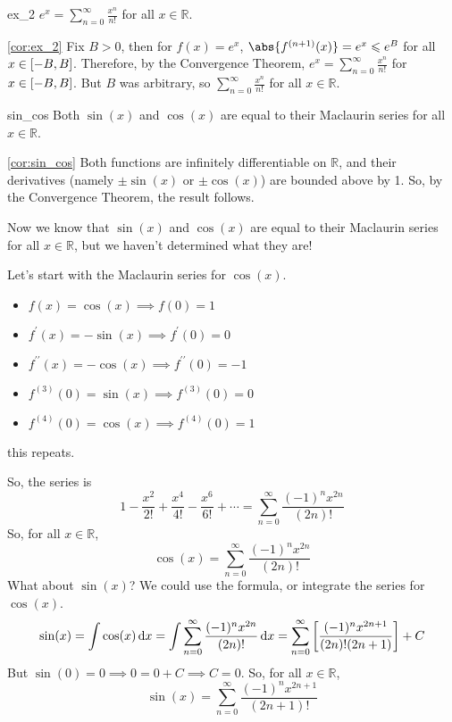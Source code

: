\begin{Corollary}{}{ex_2}
    $ \displaystyle  e^x=\sum\limits_{n=0}^{\infty}\frac{x^n}{n!} $
    for all $ x\in\mathbb{R} $.
\end{Corollary}
\begin{Proof}{\ref{cor:ex_2}}{}
    Fix $ B>0 $, then for $ f(x)=e^x $, $ \abs{f^{(n+1)}(x)}=e^x\leqslant e^B $
    for all $ x\in\interval{-B}{B} $. Therefore, by the Convergence
    Theorem, $ \displaystyle e^x=\sum\limits_{n=0}^{\infty} \frac{x^n}{n!}  $ for $ x\in\interval{-B}{B} $.
    But $ B $ was arbitrary, so $ \displaystyle\sum\limits_{n=0}^{\infty} \frac{x^n}{n!} $
    for all $ x\in\mathbb{R} $.
\end{Proof}

\begin{Corollary}{}{sin_cos}
    Both $ \sin(x) $ and $ \cos(x) $ are equal to their Maclaurin
    series for all $ x\in\mathbb{R} $.
\end{Corollary}

\begin{Proof}{\ref{cor:sin_cos}}{}
    Both functions are infinitely differentiable on
    $ \mathbb{R} $, and their derivatives (namely $ \pm \sin(x) $ or $ \pm\cos(x) $)
    are bounded above by 1. So, by the Convergence Theorem,
    the result follows.
\end{Proof}

Now we know that $ \sin(x) $ and $ \cos(x) $ are equal to their
Maclaurin series for all $ x\in\mathbb{R} $, but we haven't
determined what they are!

Let's start with the Maclaurin series for $ \cos(x) $.
\begin{itemize}
    \item $ f(x)=\cos(x)\implies f(0)=1 $
    \item $ f^\prime(x)=-\sin(x)\implies f^\prime(0)=0 $
    \item $ f^{\prime\prime}(x)=-\cos(x)\implies f^{\prime\prime}(0)=-1 $
    \item $ f^{(3)}(0)=\sin(x)\implies f^{(3)}(0)=0 $
    \item $ f^{(4)}(0)=\cos(x)\implies f^{(4)}(0)=1 $
\end{itemize}
this repeats.

So, the series is
\[ 1-\frac{x^2}{2!} +\frac{x^4}{4!} -\frac{x^6}{6!} +\cdots=
    \sum\limits_{n=0}^{\infty} \frac{(-1)^n x^{2n}}{(2n)!}  \]
So, for all $ x\in\mathbb{R} $,
\[ \cos(x)=\sum\limits_{n=0}^{\infty}\frac{(-1)^n x^{2n}}{(2n)!}   \]
What about $ \sin(x) $? We could use the formula, or integrate the
series for $ \cos(x) $.
\[ \sin(x)=\int \cos(x)\odif{x} =
    \int \sum\limits_{n=0}^{\infty} \frac{(-1)^n x^{2n}}{(2n)!} \odif{x}
    =\sum\limits_{n=0}^{\infty} \left[ \frac{(-1)^n x^{2n+1}}{(2n)!(2n+1)} \right]+C  \]
But $ \sin(0)=0\implies 0=0+C\implies C=0 $. So, for all $ x\in\mathbb{R} $,
\[ \sin(x)=\sum\limits_{n=0}^{\infty} \frac{(-1)^n x^{2n+1}}{(2n+1)!}  \]

